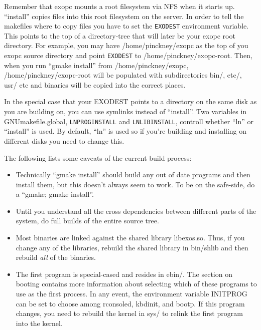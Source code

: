 \documentclass[11pt]{article}
\begin{document}
Remember that exopc mounts a root filesystem via NFS when it starts
up. ``install'' copies files into this root filesystem on the
server. In order to tell the makefiles where to copy files you have to
set the {\tt EXODEST} environment variable. This points to the top of
a directory-tree that will later be your exopc root directory. For
example, you may have /home/pinckney/exopc as the top of you exopc
source directory and point {\tt EXODEST} to
/home/pinckney/exopc-root. Then, when you run ``gmake install'' from
/home/pinckney/exopc, /home/pinckney/exopc-root will be populated with
subdirectories bin/, etc/, usr/ etc and binaries will be copied into
the correct places.

In the special case that your EXODEST points to a directory on the
same disk as you are building on, you can use symlinks instead of
``install''. Two variables in GNUmakefile.global, {\tt LNPROGINSTALL}
and {\tt LNLIBINSTALL}, controll whether ``ln'' or ``install'' is
used. By default, ``ln'' is used so if you're building and installing
on different disks you need to change this.

The following lists some caveats of the current build process:

\begin{itemize}
\item Technically ``gmake install'' should build any out of date programs
and then install them, but this doesn't always seem to work. To be
on the safe-side, do a ``gmake; gmake install''. 

\item Until you understand all the cross dependencies between different
parts of the system, do full builds of the entire source tree.

\item Most binaries are linked against the shared library libexos.so.
Thus, if you change any of the libraries, rebuild the shared library
in bin/shlib and then rebuild {\em all} of the binaries. 

\item The first program is special-cased and resides in ebin/. The
section on booting contains more information about selecting which of
these programs to use as the first process. In any event, the
environment variable INITPROG can be set to choose among rconsoled,
kbdinit, and bootp. If this program changes, you need to rebuild the
kernel in sys/ to relink the first program into the kernel.
\end{itemize}
\end{document}
